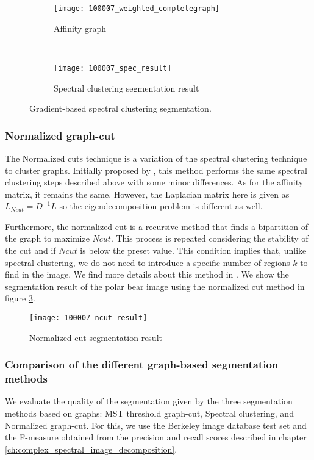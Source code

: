 \begin{figure}[!ht]
    \centering
    \begin{subfigure}[b]{0.45\textwidth}
    	\texttt{[image: 100007\_weighted\_completegraph]} 
    	\caption{Affinity graph}
    \end{subfigure}      
    ~ %
    \begin{subfigure}[b]{0.45\textwidth}
        \texttt{[image: 100007\_spec\_result]}
        \caption{Spectral clustering segmentation result}
        \label{fig:spectral_clustering_segm_result} 
    \end{subfigure}    
	\caption{Gradient-based spectral clustering segmentation.}\label{fig:spectral_clustering_process}    
\end{figure}


\subsubsection{Normalized graph-cut}
The Normalized cuts technique is a variation of the spectral clustering technique to cluster graphs. Initially proposed by \cite{JianboShi.Malik:PAMI:2000}, this method performs the same spectral clustering steps described above with some minor differences. As for the affinity matrix, it remains the same. However, the Laplacian matrix here is given as
$L_{Ncut} = D^{-1}L$
so the eigendecomposition problem is different as well.

Furthermore, the normalized cut is a recursive method that finds a bipartition of the graph to maximize $Ncut$. This process is repeated considering the stability of the cut and if $Ncut$ is below the preset value. This condition implies that, unlike spectral clustering, we do not need to introduce a specific number of regions $k$ to find in the image. We find more details about this method in \cite{JianboShi.Malik:PAMI:2000}. We show the segmentation result of the polar bear image using the normalized cut method in figure \ref{fig:norm_cut_segm_result}. 

\begin{figure}[!ht]
    \centering
  	\texttt{[image: 100007\_ncut\_result]}
    \caption{Normalized cut segmentation result}
    \label{fig:norm_cut_segm_result}    
\end{figure}


\subsubsection{Comparison of the different graph-based segmentation methods}
We evaluate the quality of the segmentation given by the three segmentation methods based on graphs: MST threshold graph-cut, Spectral clustering, and Normalized graph-cut.  For this, we use the Berkeley image database test set and the F-measure obtained from the precision and recall scores described in chapter \ref{ch:complex_spectral_image_decomposition}. 

